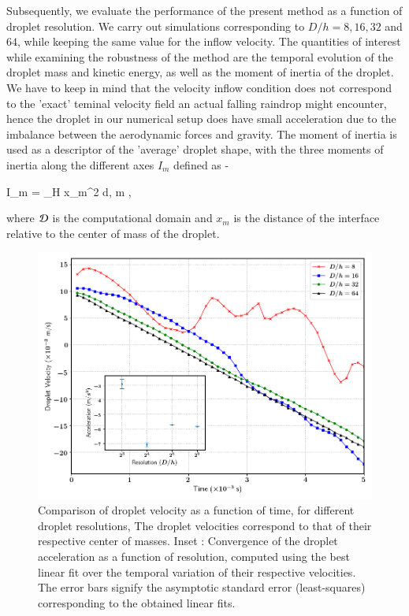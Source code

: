 Subsequently, we evaluate the performance of the present method as a function of droplet resolution. We carry out simulations corresponding to $D/h = 8, 16, 32 $ and $64$, while keeping the same value for the inflow velocity. The quantities of interest while examining the robustness of the method are the temporal evolution of the droplet mass and kinetic energy, as well as the moment of inertia of the droplet. We have to keep in mind that the velocity inflow condition does not correspond to the 'exact' teminal velocity field an actual falling raindrop might encounter, hence the droplet in our numerical setup does have small acceleration due to the imbalance between the aerodynamic forces and gravity. The moment of inertia is used as a descriptor of the 'average' droplet shape, with the three moments of inertia along the different axes $I_m$ defined as - 

\be
I_m = \int_\DDD H x_m^2 {\rm d}\X \;,  \le m ,
\nd

where ${\cal D}$ is the computational domain and $x_m$ is the distance of the interface relative to the center of mass of the droplet.   


\begin{figure}
\begin{center}
\includegraphics[scale = 0.5]{Figures/Sagar/dropl_velocity_accel_ppd.png}
\end{center}
\vspace*{-0.5cm}
\caption{Comparison of droplet velocity as a function of time, for different droplet resolutions, The droplet velocities correspond to that of their respective center of masses. Inset : Convergence of the droplet acceleration as a function of resolution, computed using the best linear fit over the temporal variation of their respective velocities. The error bars signify the asymptotic standard error (least-squares) corresponding to the obtained linear fits.} 
\label{drop_vel}
\end{figure}

